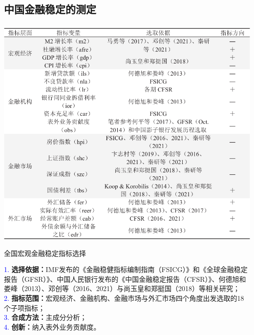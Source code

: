 \documentclass[12pt,aspectratio=169]{ctexbeamer}
\begin{document}
			\subsection{中国金融稳定的测定}
			\begin{frame}
				\frametitle{}
				\begin{table}
					\vspace{-9mm}
					\centering
					\includegraphics[height=0.75\textheight]{figures/tab.4-3}
					\caption{全国宏观金融稳定指标选择}
					\label{fsi}
				\end{table}
					\justifying
					\vspace*{-3mm}
					\hspace{2em}
					\textcolor{blue}{1.} \textbf{选择依据：}IMF发布的《金融稳健指标编制指南（FSICG）》和《全球金融稳定报告（GFSR）》、中国人民银行发布的《中国金融稳定报告（CFSR）》、何德旭和娄峰（2013）、邓创等（2016、2021）与尚玉皇和郑挺国（2018）等相关研究；\\
					\hspace{2em}
					\textcolor{blue}{2.} \textbf{指标范围：}宏观经济、金融机构、金融市场与外汇市场四个角度出发选取的18个子项指标；\\
					\hspace{2em}
					\textcolor{blue}{3.} \textbf{合成方法：}主成分分析；\\
					\hspace{2em}
					\textcolor{blue}{4.} \textbf{创新：}纳入表外业务贡献度。
			\end{frame}
\end{document}
